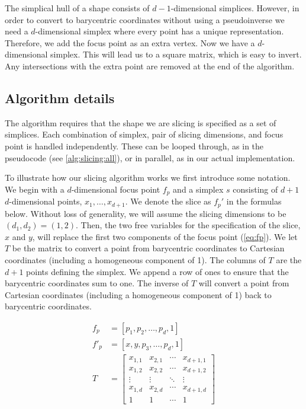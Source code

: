 The simplical hull of a shape consists of $d−1$-dimensional simplices. However, in
order to convert to barycentric coordinates without using a pseudoinverse we
need a $d$-dimensional simplex where every point has a unique representation.
Therefore, we add the focus point as an extra vertex.  Now we have a
$d$-dimensional simplex. This will lead us to a square matrix, which is easy to
invert.  Any intersections with the extra point are removed at the end of the
algorithm.

\subsection{Algorithm details}

The algorithm requires that the shape we are slicing is specified as a set of
simplices. Each combination of simplex, pair of slicing dimensions, and focus
point is handled independently. These can be looped through, as in the
pseudocode (see \autoref{alg:slicing:all}), or in parallel, as in our actual
implementation.

To illustrate how our slicing algorithm works we first introduce some notation.  We begin with a $d$-dimensional focus point $f_p$ and a simplex $s$
consisting of $d+1$ $d$-dimensional points, $x_1, \ldots, x_{d+1}$. We denote
the slice as $f_p'$ in the formulas below. Without loss of generality, we will
assume the slicing dimensions to be $(d_1,d_2)=(1,2)$. Then, the two free
variables for the specification of the slice, $x$ and $y$, will replace the
first two components of the focus point (\autoref{eq:fp}). 
We let $T$
be the matrix to convert a point from barycentric coordinates to Cartesian
coordinates (including a homogeneous component of 1). The columns of $T$ are the $d+1$ points defining the simplex. We append
a row of ones to ensure that the barycentric coordinates sum to one. The inverse
of $T$ will convert a point from Cartesian coordinates (including a homogeneous component of 1) back to barycentric coordinates.

\begin{align}
  f_p &= [p_1, p_2, \ldots, p_d,1] \\
  f'_p &= [x, y, p_3, \ldots, p_d, 1] \label{eq:fp} \\
  T &= 
    \begin{bmatrix}
      x_{1,1} & x_{2,1} & \cdots & x_{d+1,1} \\
      x_{1,2} & x_{2,2} & \cdots & x_{d+1,2} \\
      \vdots  & \vdots  & \ddots & \vdots    \\
      x_{1,d} & x_{2,d} & \cdots & x_{d+1,d} \\
      1       & 1       & \cdots & 1         
    \end{bmatrix} \\
\end{align}

